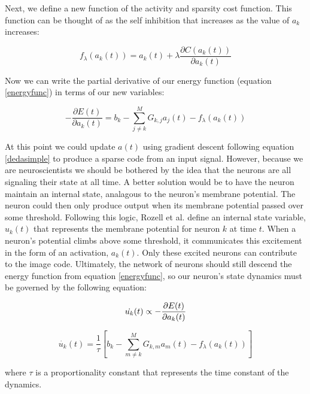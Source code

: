 Next, we define a new function of the activity and sparsity cost function. This function can be thought of as the self inhibition that increases as the value of $a_{k}$ increases:

\begin{equation}
f_{\lambda}(a_{k}(t)) = a_{k}(t) + \lambda \frac{\partial C(a_{k}(t))}{\partial a_{k}(t)}
\label{hopfieldtfunc}
\end{equation}

Now we can write the partial derivative of our energy function (equation \eqref{energyfunc}) in terms of our new variables:

\begin{equation}
    - \frac{\partial E(t)}{\partial a_{k}(t)} =
    b_{k} -
    \sum\limits_{j \neq k}^{M} G_{k,j} a_{j}(t) -
    f_{\lambda}(a_{k}(t))
\label{dedasimple}
\end{equation}

At this point we could update $a(t)$ using gradient descent following equation \eqref{dedasimple} to produce a sparse code from an input signal. However, because we are neuroscientists we should be bothered by the idea that the neurons are all signaling their state at all time. A better solution would be to have the neuron maintain an internal state, analagous to the neuron's membrane potential. The neuron could then only produce output when its membrane potential passed over some threshold. Following this logic, Rozell et al. define an internal state variable, $u_{k}(t)$ that represents the membrane potential for neuron $k$ at time $t$. When a neuron's potential climbs above some threshold, it communicates this excitement in the form of an activation, $a_{k}(t)$. Only these excited neurons can contribute to the image code. Ultimately, the network of neurons should still descend the energy function from equation \eqref{energyfunc}, so our neuron's state dynamics must be governed by the following equation:

\begin{displaymath}
    \dot{u_{k}}(t) \propto - \frac{\partial E(t)} {\partial a_{k}(t)} \\
\end{displaymath}

\begin{equation}\label{udot}
    \dot{u_{k}}(t) = \frac{1}{\tau} \left[b_{k} - \sum_{m \neq k}^{M}G_{k,m}a_{m}(t) - f_{\lambda}(a_{k}(t)) \right]
\end{equation}

where $\tau$ is a proportionality constant that represents the time constant of the dynamics.

